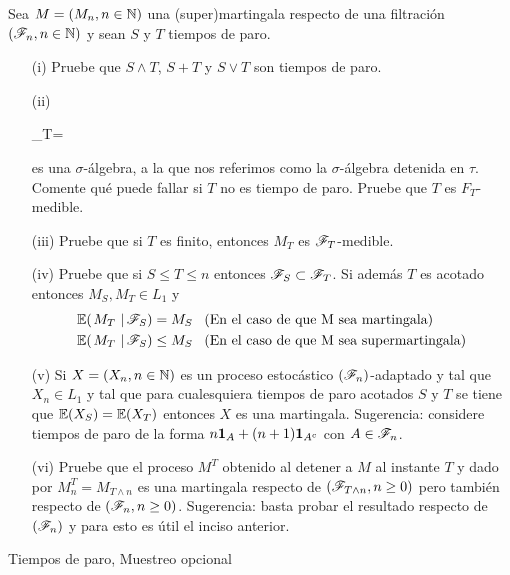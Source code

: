 \begin{problema}
	Sea $M=\left( M_n,n\in\mathbb{N}\right) $ una (super)martingala respecto de una filtraci\'on $\left( \mathscr{F}_n,n\in\mathbb{N}\right) $ y sean $S$ y $T$ tiempos de paro.
	
\begin{enumerate}
                \item[(i)] 
                	Pruebe que $S\wedge T$, $S+T$ y $S\vee T$ son tiempos de paro.
                
                \item[(ii)] 
                	\begin{esn}
                		\F_T=
                	\end{esn}
                	es una $\sigma$-\'algebra, a la que nos referimos como la $\sigma$-\'algebra 
                	detenida en $\tau$. Comente qu\'e puede fallar si $T$ no es tiempo de paro. 
                	Pruebe que $T$ es $F_T$-medible. 
                
                \item[(iii)] 
                	Pruebe que si $T$ es finito, entonces $M_T$ es $\mathscr{F}_T$-medible.
                
                \item[(iv)] 
                	Pruebe que si $S\leq T\leq n$ entonces $\mathscr{F}_S\subset\mathscr{F}_T$. Si adem\'as $T$ es acotado entonces $M_S, M_T\in L_1$ y 
                	\begin{align*}
						\espc{M_T}{\F_S} = M_S &\mbox{\;\;\;(En el caso de que M sea martingala)} \\
						\espc{M_T}{\F_S}\leq M_S &\mbox{\;\;\;(En el caso de que M sea supermartingala)}                 	
                	\end{align*}

                \item[(v)] 
                	Si $X=\left( X_n,n\in\mathbb{N}\right) $ es un proceso estoc\'astico $\left( \mathscr{F}_n\right) $-adaptado y tal que $X_n\in L_1$ y tal que 
                	para cualesquiera tiempos de paro acotados $S$ y $T$ se tiene que $\mathbb{E}\! \left( X_S \right)=\mathbb{E}\! \left( X_T \right)$ entonces $X$ es una 
                	martingala. Sugerencia: considere tiempos de paro de la forma $n{\bf{1}}_{A}+(n+1){\bf{1}}_{A^c}$ con $A\in\mathscr{F}_n$.
                	
                \item[(vi)]
					Pruebe que el proceso $M^T$ obtenido al detener a $M$ al instante $T$ y dado por $M^T_n=M_{T\wedge n}$ es una 
					martingala respecto de $\left( \mathscr{F}_{T\wedge n},n\geq 0\right) $ pero tambi\'en respecto de $\left( \mathscr{F}_{n},n\geq 0\right) $. 
					Sugerencia: basta probar el resultado respecto de $\left( \mathscr{F}_n\right) $ y para esto es \'util el inciso anterior.
\end{enumerate}

Tiempos de paro, Muestreo opcional
\end{problema}

